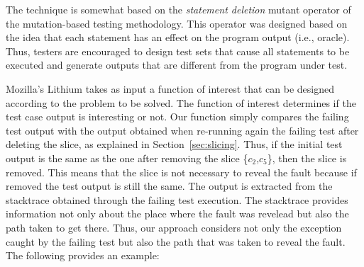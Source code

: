 \documentclass{article}
\begin{document}
%
%
%

The \cs{} technique is somewhat based on the \textit{statement deletion} mutant
operator of the mutation-based testing methodology. This operator was designed
based on the idea that each statement has an effect on the program output (i.e.,
oracle). Thus, testers are encouraged to design test sets that cause all
statements to be executed and generate outputs that are different from the
program under test.

Mozilla's Lithium takes as input a function of interest that can be designed
according to the problem to be solved. The function of interest determines if
the test case output is interesting or not. Our function simply compares the
failing test output with the output obtained when re-running again the failing
test after deleting the slice, as explained in Section~\ref{sec:slicing}. Thus,
if the initial test output is the same as the one after removing the slice
\{$c_2$,$c_5$\}, then the slice is removed. This means that the slice is not
necessary to reveal the fault because if removed the test output is still the
same. The output is extracted from the stacktrace obtained through the failing
test execution. The stacktrace provides information not only about the place
where the fault was revelead but also the path taken to get there. Thus, our
approach considers not only the exception caught by the failing test but also
the path that was taken to reveal the fault. The following provides an example:
\end{document}

